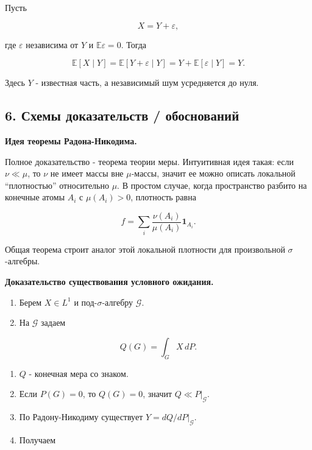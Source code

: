 \documentclass[
  11pt,
  a4paper,
]{article}
\providecommand{\tightlist}{%
  \setlength{\itemsep}{0pt}\setlength{\parskip}{0pt}}
\begin{document}
Пусть

\[
X=Y+\varepsilon,
\]

где \(\varepsilon\) независима от \(Y\) и \(\mathbb E\varepsilon=0\).
Тогда

\[
\mathbb E[X\mid Y]
=
\mathbb E[Y+\varepsilon\mid Y]
=
Y+\mathbb E[\varepsilon\mid Y]
=
Y.
\]

Здесь \(Y\) - известная часть, а независимый шум усредняется до нуля.

\subsection{6. Схемы доказательств /
обоснований}\label{ux441ux445ux435ux43cux44b-ux434ux43eux43aux430ux437ux430ux442ux435ux43bux44cux441ux442ux432-ux43eux431ux43eux441ux43dux43eux432ux430ux43dux438ux439}

\textbf{Идея теоремы Радона-Никодима.}

Полное доказательство - теорема теории меры. Интуитивная идея такая:
если \(\nu\ll\mu\), то \(\nu\) не имеет массы вне \(\mu\)-массы, значит
ее можно описать локальной ``плотностью'' относительно \(\mu\). В
простом случае, когда пространство разбито на конечные атомы \(A_i\) с
\(\mu(A_i)>0\), плотность равна

\[
f=\sum_i \frac{\nu(A_i)}{\mu(A_i)}\mathbf 1_{A_i}.
\]

Общая теорема строит аналог этой локальной плотности для произвольной
\(\sigma\)-алгебры.

\textbf{Доказательство существования условного ожидания.}

\begin{enumerate}
\def\labelenumi{\arabic{enumi}.}
\tightlist
\item
  Берем \(X\in L^1\) и под-\(\sigma\)-алгебру \(\mathcal G\).
\item
  На \(\mathcal G\) задаем
\end{enumerate}

\[
Q(G)=\int_GX\,dP.
\]

\begin{enumerate}
\def\labelenumi{\arabic{enumi}.}
\setcounter{enumi}{2}
\tightlist
\item
  \(Q\) - конечная мера со знаком.
\item
  Если \(P(G)=0\), то \(Q(G)=0\), значит \(Q\ll P|_{\mathcal G}\).
\item
  По Радону-Никодиму существует \(Y=dQ/dP|_{\mathcal G}\).
\item
  Получаем
\end{enumerate}
\end{document}
